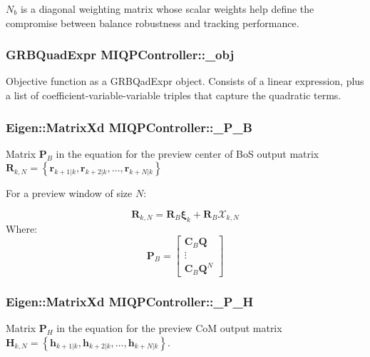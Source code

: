 $N_b$ is a diagonal weighting matrix whose scalar weights help define the compromise between balance robustness and tracking performance. \hypertarget{classMIQPController_a4bac1e68bd433553a7c00677bdc496dd}{
\subsubsection[{\-\_\-obj}]{\setlength{\rightskip}{0pt plus 5cm}\-G\-R\-B\-Quad\-Expr {\bf \-M\-I\-Q\-P\-Controller\-::\-\_\-obj}}}\label{classMIQPController_a4bac1e68bd433553a7c00677bdc496dd}
\-Objective function as a \-G\-R\-B\-Qad\-Expr object. \-Consists of a linear expression, plus a list of coefficient-\/variable-\/variable triples that capture the quadratic terms. \hypertarget{classMIQPController_a848852d659dff4a566a8dca57819587d}{
\subsubsection[{\-\_\-\-P\-\_\-\-B}]{\setlength{\rightskip}{0pt plus 5cm}\-Eigen\-::\-Matrix\-Xd {\bf \-M\-I\-Q\-P\-Controller\-::\-\_\-\-P\-\_\-\-B}}}\label{classMIQPController_a848852d659dff4a566a8dca57819587d}
\-Matrix $\mathbf{P}_B$ in the equation for the preview center of \-Bo\-S output matrix $\mathbf{R}_{k,N} = \left\{ \mathbf{r}_{k+1|k}, \mathbf{r}_{k+2|k}, \dots, \mathbf{r}_{k+N|k} \right\}$

\-For a preview window of size $N$\-:

\[ \mathbf{R}_{k,N} = \mathbf{R}_B \mathbf{\xi}_k + \mathbf{R}_B \mathcal{X}_{k,N} \] \-Where\-: \[ \mathbf{P}_B = \left[\begin{array}{c} \mathbf{C}_B \mathbf{Q} \\ \vdots\\ \mathbf{C}_B \mathbf{Q}^N \end{array}\right] \] \hypertarget{classMIQPController_afb83c4fddc4adba989506ccc9b62ff1e}{
\subsubsection[{\-\_\-\-P\-\_\-\-H}]{\setlength{\rightskip}{0pt plus 5cm}\-Eigen\-::\-Matrix\-Xd {\bf \-M\-I\-Q\-P\-Controller\-::\-\_\-\-P\-\_\-\-H}}}\label{classMIQPController_afb83c4fddc4adba989506ccc9b62ff1e}
\-Matrix $\mathbf{P}_H$ in the equation for the preview \-Co\-M output matrix $\mathbf{H}_{k,N} = \left\{ \mathbf{h}_{k+1|k}, \mathbf{h}_{k+2|k}, \dots, \mathbf{h}_{k+N|k} \right\}$.


